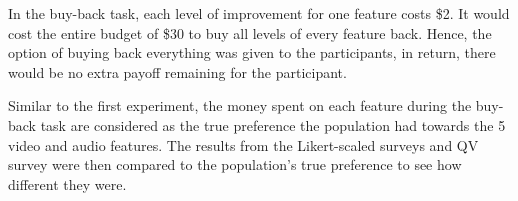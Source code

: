 In the buy-back task, 
each level of improvement for one feature costs \$2. 
It would cost the entire budget of \$30 
to buy all levels of every feature back. 
Hence, the option of buying back everything was given to the participants,
in return, there would be no extra payoff remaining for the participant.\par

Similar to the first experiment, 
the money spent on each feature during the buy-back task 
are considered as the true preference 
the population had towards the 5 video and audio features. 
The results from the Likert-scaled surveys and QV survey 
were then compared to the population's true preference 
to see how different they were.\par